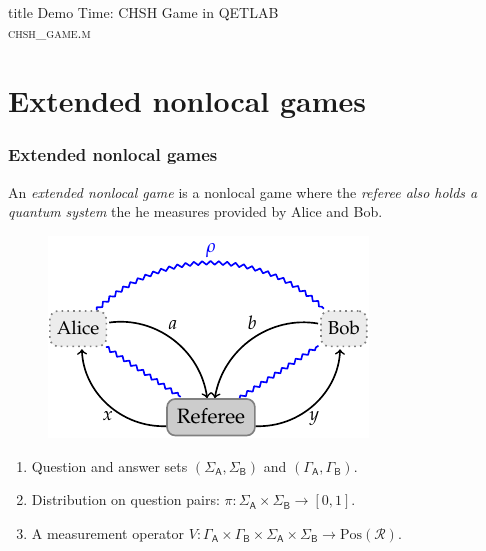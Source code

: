 \documentclass{beamer}
\def\R{\mathcal{R}}
\def \GammaA{\Gamma_{\reg{A}}}
\def \GammaB{\Gamma_{\reg{B}}}
\def \SigmaA{\Sigma_{\reg{A}}}
\def \SigmaB{\Sigma_{\reg{B}}}
\newcommand{\setft}[1]{\mathrm{#1}}
\newcommand{\Pos}{\setft{Pos}}
\newcommand{\reg}[1]{\mathsf{#1}}
\begin{document}
\begin{frame} [noframenumbering]
  \vfill
  \centering
  \begin{beamercolorbox}[sep=8pt,center,shadow=true,rounded=true]{title}
    Demo Time: CHSH Game in QETLAB \\ \textsc{chsh\_game.m}
  \end{beamercolorbox}
  \vfill
\end{frame}
    

  \section{Extended nonlocal games}

\begin{frame}
	\frametitle{Extended nonlocal games}
	An \emph{extended nonlocal game} is a nonlocal game where the \emph{referee also holds a quantum system} the he measures provided by Alice and Bob. 
	\begin{figure}[!htpb] \label{fig:extended-nonlocal-game}
	\begin{center}
		\includegraphics[scale=1.0]{figures/extended_nonlocal_game.pdf}
	\end{center}
\end{figure}
	\begin{enumerate}
		\item Question and answer sets $(\SigmaA,\SigmaB)$ and $(\GammaA,\GammaB)$. \vspace{1mm}		
		\item Distribution on question pairs: $\pi: \SigmaA \times \SigmaB \rightarrow [0,1]$.\vspace{1mm}
		\item A measurement operator $V: \GammaA \times \GammaB \times \SigmaA \times \SigmaB \rightarrow \Pos(\R)$.
	\end{enumerate}
\end{frame}
\end{document}
